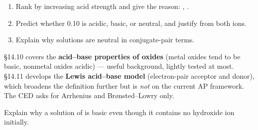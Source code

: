 \documentclass{apchem-notes}
\begin{document}
\begin{enumerate}[leftmargin=*,itemsep=0.4em]
  \item Rank by increasing acid strength and give the reason:
        , .
  \item Predict whether \SI{0.10}{\Molar}  is acidic, basic, or
        neutral, and justify from both ions.
  \item Explain why  solutions are neutral in conjugate-pair terms.
\end{enumerate}

\begin{apcnote}
\S14.10 covers the \textbf{acid--base properties of oxides} (metal oxides
tend to be basic, nonmetal oxides acidic) --- useful background, lightly
tested at most. \S14.11 develops the \textbf{Lewis acid--base model}
(electron-pair acceptor and donor), which broadens the definition further
but is \emph{not} on the current AP framework. The CED asks for Arrhenius
and Br\o nsted--Lowry only.
\end{apcnote}

\begin{exitticket}
Explain why a solution of  is basic even though it contains no
hydroxide ion initially. 
\end{exitticket}
\end{document}
